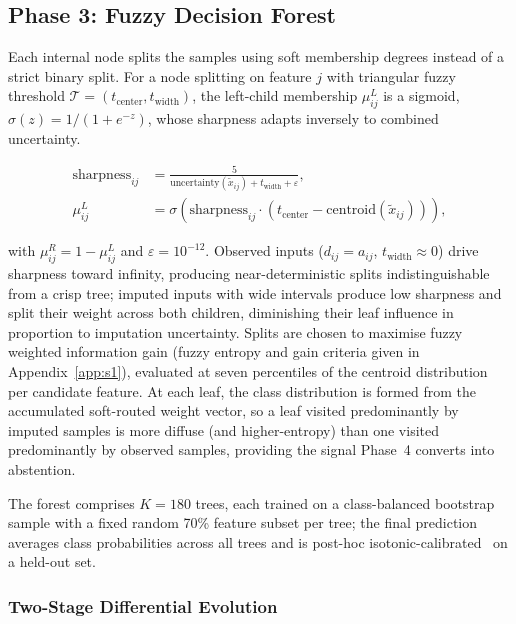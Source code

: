 \documentclass[journal]{IEEEtran}
\begin{document}
\subsection{Phase 3: Fuzzy Decision Forest}
\label{sec:phase3}

Each internal node splits the samples using soft membership degrees instead of a strict binary split. For a node splitting on feature $j$ with triangular fuzzy threshold $\mathcal{T}=(t_{\text{center}},t_{\text{width}})$, the left-child membership $\mu^L_{ij}$ is a sigmoid, $\sigma(z) = 1/(1+e^{-z})$, whose sharpness adapts inversely to combined uncertainty.

\begin{align}
	\text{sharpness}_{ij}
	&=\frac{5}{\text{uncertainty}(\tilde{x}_{ij})+t_{\text{width}}+\varepsilon},
	\label{eq:sharpness}\\[4pt]
	\mu^L_{ij}
	&=\sigma\!\left(\text{sharpness}_{ij}\cdot
	\left(t_{\text{center}}-\text{centroid}(\tilde{x}_{ij})\right)\right),
	\label{eq:mu_left}
\end{align}

\noindent with $\mu^R_{ij}=1-\mu^L_{ij}$ and $\varepsilon=10^{-12}$. Observed inputs ($d_{ij}=a_{ij}$, $t_{\text{width}}\approx0$) drive sharpness toward infinity, producing near-deterministic splits indistinguishable from a crisp tree; imputed inputs with wide intervals produce low sharpness and split their weight across both children, diminishing their leaf influence in proportion to imputation uncertainty. Splits are chosen to maximise fuzzy weighted information gain (fuzzy entropy and gain criteria given in Appendix~\ref{app:s1}), evaluated at seven percentiles of the centroid distribution per candidate feature. At each leaf, the class distribution is formed from the accumulated soft-routed weight vector, so a leaf visited predominantly by imputed samples is more diffuse (and higher-entropy) than one visited predominantly by observed samples, providing the signal Phase~4 converts into abstention.

The forest comprises $K=180$ trees, each trained on a class-balanced bootstrap sample with a fixed random 70\% feature subset per tree; the final prediction averages class probabilities across all trees and is post-hoc isotonic-calibrated~\cite{zadrozny2002transforming} on a held-out set.

\subsubsection{Two-Stage Differential Evolution}
\label{sec:de}
\end{document}
